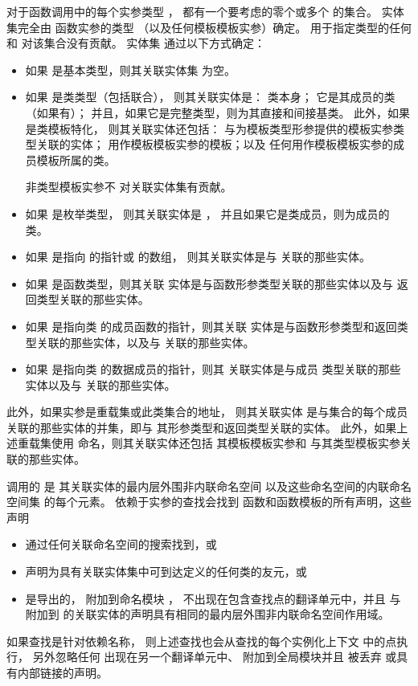 \pnum
对于函数调用中的每个实参类型 ，
都有一个要考虑的零个或多个  的集合。
实体集完全由
函数实参的类型
（以及任何模板模板实参）确定。
用于指定类型的任何  和 
对该集合没有贡献。
实体集
通过以下方式确定：
\begin{itemize}
\item 如果  是基本类型，则其关联实体集
为空。

\item 如果  是类类型（包括联合），
则其关联实体是：
类本身；
它是其成员的类（如果有）；
并且，如果它是完整类型，则为其直接和间接基类。
此外，如果  是类模板特化，
则其关联实体还包括：
与为模板类型形参提供的模板实参类型关联的实体；
用作模板模板实参的模板；以及
任何用作模板模板实参的成员模板所属的类。
\begin{note}
非类型模板实参不
对关联实体集有贡献。
\end{note}

\item 如果  是枚举类型，
则其关联实体是 ，
并且如果它是类成员，则为成员的类。

\item 如果  是指向  的指针或  的数组，
则其关联实体是与  关联的那些实体。

\item 如果  是函数类型，则其关联
实体是与函数形参类型关联的那些实体以及与
返回类型关联的那些实体。

\item 如果  是指向类  的成员函数的指针，则其关联
实体是与函数形参类型和返回类型关联的那些实体，以及与
 关联的那些实体。

\item 如果  是指向类  的数据成员的指针，则其
关联实体是与成员
类型关联的那些实体以及与  关联的那些实体。
\end{itemize}
此外，如果实参是重载集或此类集合的地址，
则其关联实体
是与集合的每个成员关联的那些实体的并集，即与
其形参类型和返回类型关联的实体。
此外，如果上述重载集使用
 命名，则其关联实体还包括
其模板模板实参和
与其类型模板实参关联的那些实体。

\pnum
调用的  是
其关联实体的最内层外围非内联命名空间
以及这些命名空间的内联命名空间集 的每个元素。
依赖于实参的查找会找到
函数和函数模板的所有声明，这些声明
\begin{itemize}
\item
通过任何关联命名空间的搜索找到，或
\item
声明为具有关联实体集中可到达定义的任何类的友元，或
\item
是导出的，
附加到命名模块 ，
不出现在包含查找点的翻译单元中，并且
与附加到  的关联实体的声明具有相同的最内层外围非内联命名空间作用域。
\end{itemize}
如果查找是针对依赖名称，
则上述查找也会从查找的每个实例化上下文 中的点执行，
另外忽略任何
出现在另一个翻译单元中、
附加到全局模块并且
被丢弃 或具有内部链接的声明。

